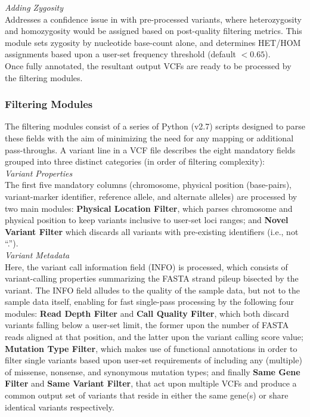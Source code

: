\documentclass[twocolumn]{bmcart}%
\newcommand{\triplesub}[2]{\noindent\textsl{#1}\\#2\\}  %
\begin{document}
\triplesub{Adding Zygosity}{
Addresses a confidence issue in with pre-processed variants, where heterozygosity and homozygosity would be assigned based on post-quality filtering metrics. This module sets zygosity by nucleotide base-count alone, and determines HET/HOM assignments based upon a user-set frequency threshold (default $<0.65$).}

Once fully annotated, the resultant output VCFs are ready to be processed by the filtering modules.



\subsubsection{Filtering Modules}

The filtering modules consist of a series of Python (v2.7) scripts designed to parse these fields with the aim of minimizing the need for any mapping or additional pass-throughs. A variant line in a VCF file describes the eight mandatory fields grouped into three distinct categories (in order of filtering complexity):\\

\triplesub{Variant Properties}{
The first five mandatory columns (chromosome, physical position (base-pairs), variant-marker identifier, reference allele, and alternate alleles) are processed by two main modules: \textbf{Physical Location Filter}, which parses chromosome and physical position to keep variants inclusive to user-set loci ranges; and \textbf{Novel Variant Filter} which discards all variants with pre-existing identifiers (i.e., not ``.'').}

\triplesub{Variant Metadata}{
Here, the variant call information field (INFO) is processed, which consists of variant-calling properties summarizing the FASTA strand pileup bisected by the variant. The INFO field alludes to the quality of the sample data, but not to the sample data itself, enabling for fast single-pass processing by the following four modules: \textbf{Read Depth Filter} and \textbf{Call Quality Filter}, which both discard variants falling below a user-set limit, the former upon the number of FASTA reads aligned at that position, and the latter upon the variant calling score value; \textbf{Mutation Type Filter}, which makes use of functional annotations in order to filter single variants based upon user-set requirements of including any (multiple) of missense, nonsense, and synonymous mutation types; and finally \textbf{Same Gene Filter} and \textbf{Same Variant Filter}, that act upon multiple VCFs and produce a common output set of variants that reside in either the same gene(s) or share identical variants respectively.}
\end{document}
